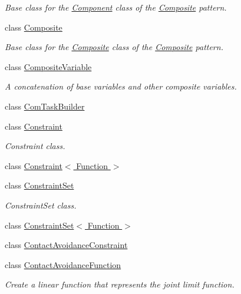 \begin{DoxyCompactItemize}
\begin{DoxyCompactList}\small\item\em Base class for the \hyperlink{classocra_1_1Component}{Component} class of the \hyperlink{classocra_1_1Composite}{Composite} pattern. \end{DoxyCompactList}\item 
class \hyperlink{classocra_1_1Composite}{Composite}
\begin{DoxyCompactList}\small\item\em Base class for the \hyperlink{classocra_1_1Composite}{Composite} class of the \hyperlink{classocra_1_1Composite}{Composite} pattern. \end{DoxyCompactList}\item 
class \hyperlink{classocra_1_1CompositeVariable}{Composite\+Variable}
\begin{DoxyCompactList}\small\item\em A concatenation of base variables and other composite variables. \end{DoxyCompactList}\item 
class \hyperlink{classocra_1_1ComTaskBuilder}{Com\+Task\+Builder}
\item 
class \hyperlink{classocra_1_1Constraint}{Constraint}
\begin{DoxyCompactList}\small\item\em Constraint class. \end{DoxyCompactList}\item 
class \hyperlink{classocra_1_1Constraint_3_01Function_01_4}{Constraint$<$ Function $>$}
\item 
class \hyperlink{classocra_1_1ConstraintSet}{Constraint\+Set}
\begin{DoxyCompactList}\small\item\em Constraint\+Set class. \end{DoxyCompactList}\item 
class \hyperlink{classocra_1_1ConstraintSet_3_01Function_01_4}{Constraint\+Set$<$ Function $>$}
\item 
class \hyperlink{classocra_1_1ContactAvoidanceConstraint}{Contact\+Avoidance\+Constraint}
\item 
class \hyperlink{classocra_1_1ContactAvoidanceFunction}{Contact\+Avoidance\+Function}
\begin{DoxyCompactList}\small\item\em Create a linear function that represents the joint limit function. \end{DoxyCompactList}\item 

\end{DoxyCompactItemize}
